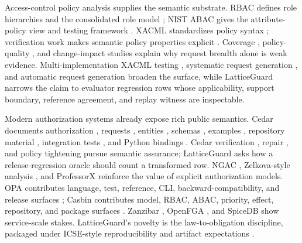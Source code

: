 \documentclass[10pt,conference]{IEEEtran}
\begin{document}
Access-control policy analysis supplies the semantic substrate.  RBAC defines role hierarchies \cite{ferraiolo1992rbac} and the consolidated role model \cite{sandhu1996rbac}; NIST ABAC gives the attribute-policy view \cite{nist800162} and testing framework \cite{nist800192}.  XACML standardizes policy syntax \cite{oasis2013xacml}; verification work makes semantic policy properties explicit \cite{fisler2005verification}.  Coverage \cite{martin2006coverage}, policy-quality \cite{martin2008quality}, and change-impact studies \cite{martin2007changeimpact} explain why request breadth alone is weak evidence.  Multi-implementation XACML testing \cite{li2008xacmlmultiple}, systematic request generation \cite{bertolino2010systematic}, and automatic request generation \cite{bertolino2012xacmlrequests} broaden the surface, while LatticeGuard narrows the claim to evaluator regression rows whose applicability, support boundary, reference agreement, and replay witness are inspectable.

Modern authorization systems already expose rich public semantics.  Cedar documents authorization \cite{cedar_authz_docs}, requests \cite{cedar_request_docs}, entities \cite{cedar_entities_docs}, schemas \cite{cedar_schema_docs}, examples \cite{cedar_policy_examples_docs}, repository material \cite{cedar_github}, integration tests \cite{cedar_integration_tests}, and Python bindings \cite{cedarpy_pypi}.  Cedar verification \cite{cutler2024cedar}, repair \cite{disselkoen2024cedarvgd}, and policy tightening \cite{wu2026restricter} pursue semantic assurance; LatticeGuard asks how a release-regression oracle should count a transformed row.  NGAC \cite{guttman2025ngac}, Zelkova-style analysis \cite{backes2020stratified} \cite{backes2018zelkova}, and ProfessorX \cite{weintraub2025professorx} reinforce the value of explicit authorization models.  OPA contributes language, test, reference, CLI, backward-compatibility, and release surfaces \cite{opa_language_docs} \cite{opa_policy_testing} \cite{opa_policy_reference} \cite{opa_cli_docs} \cite{opa_backwards} \cite{opa_release1171}; Casbin contributes model, RBAC, ABAC, priority, effect, repository, and package surfaces \cite{casbin_model_docs} \cite{casbin_rbac_docs} \cite{casbin_abac_docs} \cite{casbin_priority_docs} \cite{casbin_effect_docs} \cite{casbin_py_repo} \cite{pycasbin_pypi}.  Zanzibar \cite{pang2019zanzibar}, OpenFGA \cite{openfga_docs}, and SpiceDB \cite{spicedb_docs} show service-scale stakes.  LatticeGuard's novelty is the law-to-obligation discipline, packaged under ICSE-style reproducibility and artifact expectations \cite{icse2027_research} \cite{ieee_format} \cite{muttakin2026openscience} \cite{ahmed2024icseartifacts}.
\end{document}
